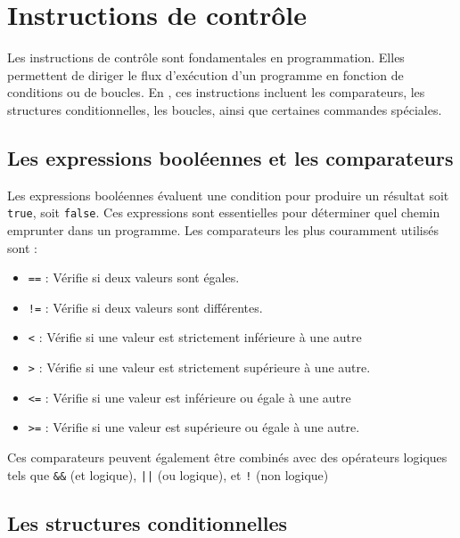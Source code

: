 \chapter{Instructions de contrôle}

Les instructions de contrôle sont fondamentales en programmation. Elles permettent de diriger le flux d'exécution d’un programme en fonction de conditions ou de boucles. En \cpp, ces instructions incluent les comparateurs, les structures conditionnelles, les boucles, ainsi que certaines commandes spéciales.

\section{Les expressions booléennes et les comparateurs}

Les expressions booléennes évaluent une condition pour produire un résultat soit \lstinline[]|true|, soit \lstinline[]|false|. Ces expressions sont essentielles pour déterminer quel chemin emprunter dans un programme. Les comparateurs les plus couramment utilisés sont :


\begin{itemize}
	\item \lstinline[]|==| : Vérifie si deux valeurs sont égales.
	\item \lstinline[]|!=| : Vérifie si deux valeurs sont différentes.
	\item \lstinline[]|<| : Vérifie si une valeur est strictement inférieure à une autre
	\item \lstinline[]|>| : Vérifie si une valeur est strictement supérieure à une autre.
	\item \lstinline[]|<=| : Vérifie si une valeur est inférieure ou égale à une autre
	\item \lstinline[]|>=| : Vérifie si une valeur est supérieure ou égale à une autre.
\end{itemize}


Ces comparateurs peuvent également être combinés avec des opérateurs logiques tels que \lstinline|&&| (et logique), \lstinline/||/ (ou logique), et \lstinline|!| (non logique)




\section{Les structures conditionnelles}

